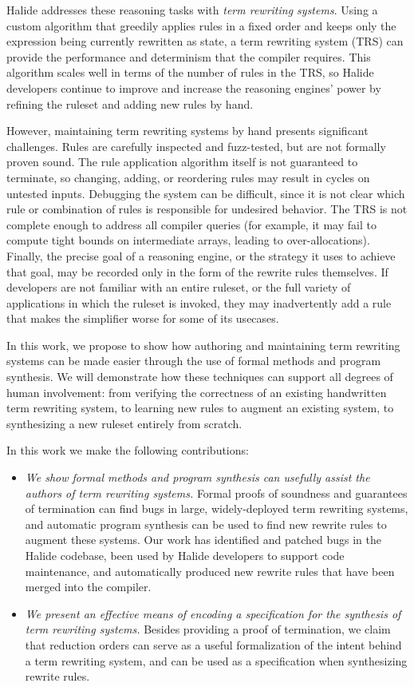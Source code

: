 Halide addresses these reasoning tasks with \emph{term rewriting systems}. Using a custom algorithm 
that greedily applies rules in a fixed order and keeps only the expression being currently 
rewritten as state, a term rewriting system (TRS) can provide the performance and determinism 
that the compiler requires. This algorithm scales well in terms of the number of rules
in the TRS, so Halide developers continue to improve and increase the reasoning engines'
power by refining the ruleset and adding new rules by hand.

However, maintaining term rewriting systems by hand presents significant challenges. Rules are 
carefully inspected and fuzz-tested, but are not formally proven sound. The 
rule application algorithm itself is not guaranteed to terminate, so changing, adding, or 
reordering rules may result in cycles on untested inputs. Debugging the system can be 
difficult, since it is not clear which rule or combination of rules is responsible for 
undesired behavior. The TRS is not complete enough to address all compiler queries 
(for example, it may fail to compute tight bounds on intermediate arrays, leading to over-allocations).
Finally, the precise goal of a reasoning engine, or the strategy it uses to achieve that goal,
may be recorded only in the form of the rewrite rules themselves. If developers are not familiar with 
an entire ruleset, or the full variety of applications in which the ruleset is invoked, they may inadvertently 
add a rule that makes the simplifier worse for some of its usecases.

In this work, we propose to show how authoring and maintaining term rewriting systems can be made easier through the use of formal methods and program synthesis. We will demonstrate how these techniques can support all degrees of human involvement: from verifying the correctness of an existing handwritten term rewriting system, to learning new rules to augment an existing system, to synthesizing a new ruleset entirely from scratch.

In this work we make the following contributions:

\begin{itemize}
    \item \emph{We show formal methods and program synthesis can usefully assist the authors of term rewriting systems.} Formal proofs of soundness and guarantees of termination can find bugs in large, widely-deployed term rewriting systems, and automatic program synthesis can be used to find new rewrite rules to augment these systems. Our work has identified and patched bugs in the Halide codebase, been used by Halide developers to support code maintenance, and automatically produced new rewrite rules that have been merged into the compiler.
    \item \emph{We present an effective means of encoding a specification for the synthesis of term rewriting systems.} Besides providing a proof of termination, we claim that reduction orders can serve as a useful formalization of the intent behind a term rewriting system, and can be used as a specification when synthesizing rewrite rules.
\end{itemize}

